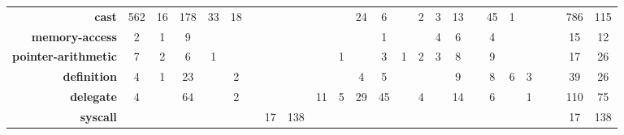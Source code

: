 \begin{table*}[htp!]
\begin{adjustbox}{max width=\textwidth}
\begin{tabular}{r|cc|cc|cc|cc|cc|cc|cc|cc|cc|cc|cc|cc}
                    \textbf{cast} & 562 & 16 & 178 & 33 & 18 & & & & & & 24 & 6 && 2 & 3 & 13 & & 45 & 1 & & & & 786 & 115 \\ 
\rowcolor{verylightgray}
      \textbf{memory-access} &    2 &    1 &    9 &      &      &      &       &      &        &      &      &    1 &      &      &      4 &    6 &       &    4 &         &      &        &      &    15 &   12 \\
 \textbf{pointer-arithmetic} &    7 &    2 &    6 &    1 &      &      &       &      &        &    1 &      &    3 &    1 &    2 &      3 &    8 &       &    9 &         &      &        &      &    17 &   26 \\
\rowcolor{verylightgray}
         \textbf{definition} &    4 &    1 &   23 &      &    2 &      &       &      &        &      &    4 &    5 &      &      &        &    9 &       &    8 &       6 &    3 &        &      &    39 &   26 \\
           \textbf{delegate} &    4 &      &   64 &      &    2 &      &       &      &     11 &    5 &   29 &   45 &      &    4 &        &   14 &       &    6 &         &    1 &        &      &   110 &   75 \\
\rowcolor{verylightgray}
            \textbf{syscall} &      &      &      &      &      &      &    17 &  138 &        &      &      &      &      &      &        &      &       &      &         &      &        &      &    17 &  138 \\

\end{tabular}
\end{adjustbox}
\end{table*}
